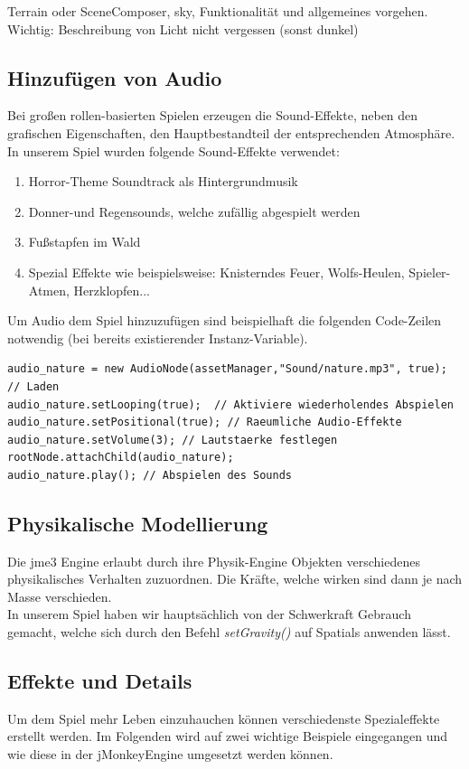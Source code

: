 Terrain oder SceneComposer, sky,  
Funktionalität und allgemeines vorgehen.
Wichtig: Beschreibung von Licht nicht vergessen (sonst dunkel)

\subsection{Hinzufügen von Audio}
Bei großen rollen-basierten Spielen erzeugen die Sound-Effekte, neben den grafischen Eigenschaften, den Hauptbestandteil der entsprechenden Atmosphäre. In unserem Spiel wurden folgende Sound-Effekte verwendet:
\begin{enumerate}
	\item Horror-Theme Soundtrack als Hintergrundmusik
	\item Donner-und Regensounds, welche zufällig abgespielt werden
	\item Fußstapfen im Wald
	\item Spezial Effekte wie beispielsweise: Knisterndes Feuer, Wolfs-Heulen, Spieler-Atmen, Herzklopfen...
\end{enumerate} Um Audio dem Spiel hinzuzufügen sind beispielhaft die folgenden Code-Zeilen notwendig (bei bereits existierender Instanz-Variable).

\begin{lstlisting}
audio_nature = new AudioNode(assetManager,"Sound/nature.mp3", true); // Laden
audio_nature.setLooping(true);  // Aktiviere wiederholendes Abspielen
audio_nature.setPositional(true); // Raeumliche Audio-Effekte  
audio_nature.setVolume(3); // Lautstaerke festlegen
rootNode.attachChild(audio_nature); 
audio_nature.play(); // Abspielen des Sounds
\end{lstlisting}


\subsection{Physikalische Modellierung}
Die jme3 Engine erlaubt durch ihre Physik-Engine Objekten verschiedenes physikalisches Verhalten zuzuordnen. Die Kräfte, welche wirken sind dann je nach Masse verschieden.\\
In unserem Spiel haben wir hauptsächlich von der Schwerkraft Gebrauch gemacht, welche sich durch den Befehl\emph{ setGravity()} auf Spatials anwenden lässt.

\subsection{Effekte und Details}
Um dem Spiel mehr Leben einzuhauchen können verschiedenste Spezialeffekte erstellt werden. Im Folgenden wird auf zwei wichtige Beispiele eingegangen und wie diese in der jMonkeyEngine umgesetzt werden können.
